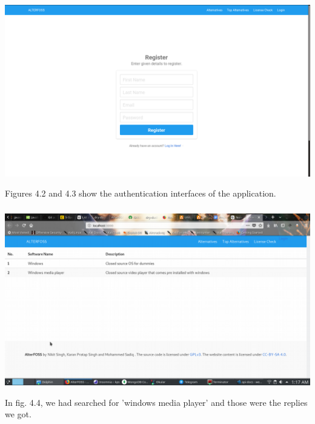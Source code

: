 \begin{center}
\includegraphics[scale=0.29]{images/register.png}
\end{center}

Figures 4.2 and 4.3 show the authentication interfaces of the application.


\subsubsection{}

\begin{center}
\includegraphics[scale=0.45]{images/4-2.png} 
\end{center}

In fig. 4.4, we had searched for 'windows media player' and those were the replies we got.

\subsubsection{}

